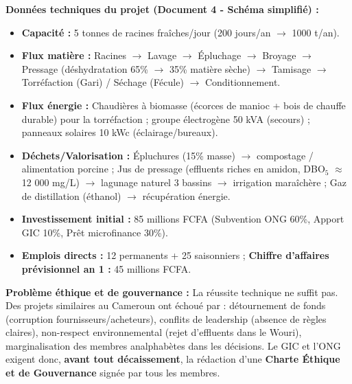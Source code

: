 \documentclass[11pt]{article}
\begin{document}
\textbf{Données techniques du projet (Document 4 - Schéma simplifié) :}
\begin{itemize}
    \item \textbf{Capacité :} 5 tonnes de racines fraîches/jour (200 jours/an $\rightarrow$ 1000 t/an).
    \item \textbf{Flux matière :} Racines $\rightarrow$ Lavage $\rightarrow$ Épluchage $\rightarrow$ Broyage $\rightarrow$ Pressage (déshydratation 65\% $\rightarrow$ 35\% matière sèche) $\rightarrow$ Tamisage $\rightarrow$ Torréfaction (Gari) / Séchage (Fécule) $\rightarrow$ Conditionnement.
    \item \textbf{Flux énergie :} Chaudières à biomasse (écorces de manioc + bois de chauffe durable) pour la torréfaction ; groupe électrogène 50 kVA (secours) ; panneaux solaires 10 kWc (éclairage/bureaux).
    \item \textbf{Déchets/Valorisation :} Épluchures (15\% masse) $\rightarrow$ compostage / alimentation porcine ; Jus de pressage (effluents riches en amidon, DBO$_5$ $\approx$ 12 000 mg/L) $\rightarrow$ lagunage naturel 3 bassins $\rightarrow$ irrigation maraîchère ; Gaz de distillation (éthanol) $\rightarrow$ récupération énergie.
    \item \textbf{Investissement initial :} 85 millions FCFA (Subvention ONG 60\%, Apport GIC 10\%, Prêt microfinance 30\%).
    \item \textbf{Emplois directs :} 12 permanents + 25 saisonniers ; \textbf{Chiffre d'affaires prévisionnel an 1 :} 45 millions FCFA.
\end{itemize}

\textbf{Problème éthique et de gouvernance :} La réussite technique ne suffit pas. Des projets similaires au Cameroun ont échoué par : détournement de fonds (corruption fournisseurs/acheteurs), conflits de leadership (absence de règles claires), non-respect environnemental (rejet d'effluents dans le Wouri), marginalisation des membres analphabètes dans les décisions. Le GIC et l'ONG exigent donc, \textbf{avant tout décaissement}, la rédaction d'une \textbf{Charte Éthique et de Gouvernance} signée par tous les membres.
\end{document}
